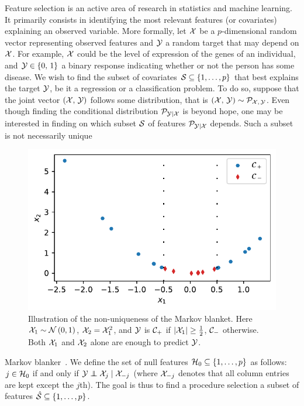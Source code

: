 Feature selection is an active area of research in statistics and machine learning.
It primarily consists in identifying the most relevant features (or covariates) explaining an observed variable.
More formally, let $\mathcal{X}$ be a $p$-dimensional random vector representing observed features
and $\mathcal{Y}$ a random target that may depend on $\mathcal{X}$.
For example, $\mathcal{X}$ could be the level of expression of the genes of an individual,
and $\mathcal{Y} \in \left\{ 0,\, 1 \right\}$ a binary response indicating whether or not the person has some disease.
We wish to find the subset of covariates $\mathcal{S} \subseteq \left\{ 1, \dots, p \right\}$ that best explains the target $\mathcal{Y}$,
be it a regression or a classification problem.
To do so, suppose that the joint vector $\left( \mathcal{X},\, \mathcal{Y} \right)$ follows some distribution,
that is $\left( \mathcal{X},\, \mathcal{Y} \right) \sim \mathcal{P}_{\mathcal{X},\, \mathcal{Y}}$.
Even though finding the conditional distribution $\mathcal{P}_{\mathcal{Y} \mid \mathcal{X}}$ is beyond hope,
one may be interested in finding on which subset $\mathcal{S}$ of features $\mathcal{P}_{\mathcal{Y} \mid \mathcal{X}}$ depends.
Such a subset is not necessarily unique
\begin{figure}
        \includegraphics[width=1\linewidth]{figures/fs_subset_not_unique.pdf}
        \caption{
                Illustration of the non-uniqueness of the Markov blanket.
                Here $\mathcal{X}_1 \sim \mathcal{N}\left( 0, 1 \right)$,
                $\mathcal{X}_2 = \mathcal{X}_1^2$,
                and $\mathcal{Y}$ is $\mathcal{C}_+$ if $\left\lvert\mathcal{X}_1\right\rvert \geq \frac{1}{2}$,
                $\mathcal{C}_-$ otherwise.
                Both $\mathcal{X}_1$ and $\mathcal{X}_2$ alone are enough to predict $\mathcal{Y}$.
        }
        \label{fig:fs_subset_not_unique}
\end{figure}
Markov blanker~\cite{markov_blanket}.
We define the set of null features $\mathcal{H}_0 \subseteq \left\{ 1, \dots, p \right\}$ as follows:
$j \in \mathcal{H}_0$ if and only if $\cY \independent \cX_j \mid \cX_{-j}$
(where $\mathcal{X}_{-j}$ denotes that all column entries are kept except the $j$th).
The goal is thus to find a procedure selection a subset of features
$\hat{\mathcal{S}} \subseteq \left\{ 1, \dots, p \right\}$.

